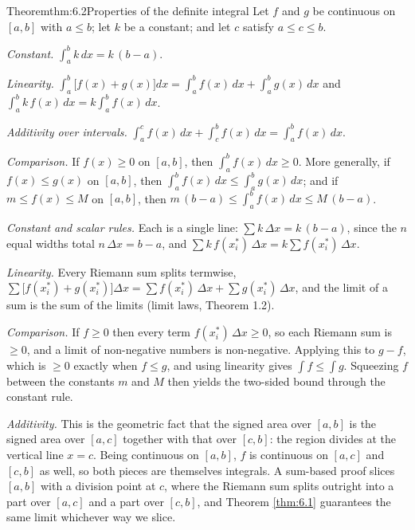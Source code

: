 \documentclass[a4paper,12pt,oneside]{memoir}
\begin{document}
\begin{envtheorem}{Theorem}{thm:6.2}{Properties of the definite integral}
Let \(f\) and \(g\) be continuous on \([a, b]\) with \(a \le b\); let \(k\) be a constant; and let \(c\) satisfy \(a \le c \le b\).

\begin{steps}
  \item \emph{Constant.} \(\displaystyle\int_{a}^{b} k\,dx = k\,(b - a)\).
  \item \emph{Linearity.} \(\displaystyle\int_{a}^{b}\bigl[f(x) + g(x)\bigr]dx = \int_{a}^{b} f(x)\,dx + \int_{a}^{b} g(x)\,dx\) and \(\displaystyle\int_{a}^{b} k\,f(x)\,dx = k\int_{a}^{b} f(x)\,dx\).
  \item \emph{Additivity over intervals.} \(\displaystyle\int_{a}^{c} f(x)\,dx + \int_{c}^{b} f(x)\,dx = \int_{a}^{b} f(x)\,dx\).
  \item \emph{Comparison.} If \(f(x) \ge 0\) on \([a, b]\), then \(\displaystyle\int_{a}^{b} f(x)\,dx \ge 0\). More generally, if \(f(x) \le g(x)\) on \([a, b]\), then \(\displaystyle\int_{a}^{b} f(x)\,dx \le \int_{a}^{b} g(x)\,dx\); and if \(m \le f(x) \le M\) on \([a, b]\), then \(\displaystyle m\,(b - a) \le \int_{a}^{b} f(x)\,dx \le M\,(b - a)\).
\end{steps}
\end{envtheorem}
\emph{Constant and scalar rules.} Each is a single line: \(\sum k\,\Delta x = k\,(b - a)\), since the \(n\) equal widths total \(n\,\Delta x = b - a\), and \(\sum k\,f(x_{i}^{*})\,\Delta x = k \sum f(x_{i}^{*})\,\Delta x\).

\emph{Linearity.} Every Riemann sum splits termwise, \(\sum \bigl[f(x_{i}^{*}) + g(x_{i}^{*})\bigr]\Delta x = \sum f(x_{i}^{*})\,\Delta x + \sum g(x_{i}^{*})\,\Delta x\), and the limit of a sum is the sum of the limits (limit laws, Theorem 1.2).

\emph{Comparison.} If \(f \ge 0\) then every term \(f(x_{i}^{*})\,\Delta x \ge 0\), so each Riemann sum is \(\ge 0\), and a limit of non-negative numbers is non-negative. Applying this to \(g - f\), which is \(\ge 0\) exactly when \(f \le g\), and using linearity gives \(\int f \le \int g\). Squeezing \(f\) between the constants \(m\) and \(M\) then yields the two-sided bound through the constant rule.

\emph{Additivity.} This is the geometric fact that the signed area over \([a, b]\) is the signed area over \([a, c]\) together with that over \([c, b]\): the region divides at the vertical line \(x = c\). Being continuous on \([a, b]\), \(f\) is continuous on \([a, c]\) and \([c, b]\) as well, so both pieces are themselves integrals. A sum-based proof slices \([a, b]\) with a division point at \(c\), where the Riemann sum splits outright into a part over \([a, c]\) and a part over \([c, b]\), and Theorem \ref{thm:6.1} guarantees the same limit whichever way we slice.
\end{document}
